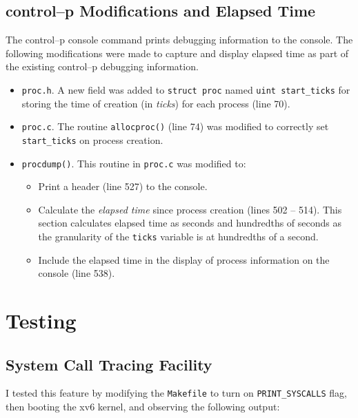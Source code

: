 \documentclass[11pt,letterpaper]{report}
\begin{document}
	\newpage
		
	\subsection*{control--p Modifications and Elapsed Time}
	The control--p console command prints debugging information to the console. The following modifications were made to capture and display elapsed time as part of the existing control--p debugging information.
	
	\begin{itemize}
	\item {\tt proc.h}. A new field was added to {\tt struct proc} named {\tt uint start\_ticks} for storing the time of creation (in \emph{ticks}) for each process ({\color{red}line 70}). 

	\item {\tt proc.c}. The routine {\tt allocproc()} ({\color{red}line 74}) was modified to correctly set  {\tt start\_ticks} on process creation.
	
	\item {\tt procdump()}. This routine in {\tt proc.c} was modified to:
	
	\begin{itemize}
	
	\item Print a header ({\color{red}line 527}) to the console.
	
	\item Calculate the \emph{elapsed time} since process creation ({\color{red}lines 502 -- 514}). This section calculates elapsed time as seconds and hundredths of seconds as the granularity of the {\tt ticks} variable is at hundredths of a second.
	
	\item Include the elapsed time in the display of process information on the console ({\color{red}line 538}).
	
	\end{itemize}
	
	\end{itemize}
	

\newpage
	\section*{Testing}
	
	\subsection*{System Call Tracing Facility}
	I tested this feature by modifying the {\tt Makefile} to turn on {\tt PRINT\_SYSCALLS} flag, then booting the xv6 kernel, and observing the following output:
	
\end{document}
